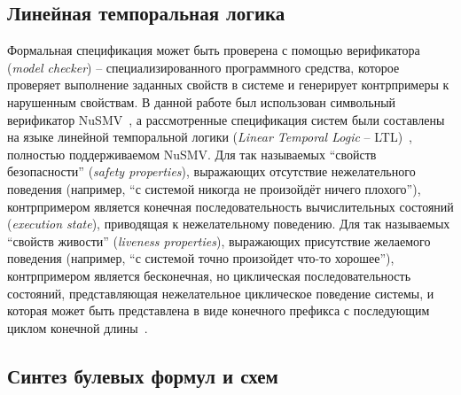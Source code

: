 
\subsection{Линейная темпоральная логика}%
\label{sub:ltl}


Формальная спецификация может быть проверена с помощью верификатора (\emph{model checker}) \--- специализированного программного средства, которое проверяет выполнение заданных свойств в системе и генерирует контрпримеры к нарушенным свойствам.
В данной работе был использован символьный верификатор NuSMV~\cite{NuSMV}, а рассмотренные спецификация систем были составлены на языке линейной темпоральной логики (\textit{Linear Temporal Logic} \--- LTL)~\cite{ltl}, полностью поддерживаемом NuSMV\@.
Для так называемых \enquote{свойств безопасности} (\textit{safety properties}), выражающих отсутствие нежелательного поведения (например, \enquote{с системой никогда не произойдёт ничего плохого}), контрпримером является конечная последовательность вычислительных состояний (\textit{execution state}), приводящая к нежелательному поведению.
Для так называемых \enquote{свойств живости} (\textit{liveness properties}), выражающих присутствие желаемого поведения (например, \enquote{с системой точно произойдет что-то хорошее}), контрпримером является бесконечная, но циклическая последовательность состояний, представляющая нежелательное циклическое поведение системы, и которая может быть представлена в виде конечного префикса с последующим циклом конечной длины~\cite{clarke1999}.



\subsection{Синтез булевых формул и схем}
\label{sub:circuits-synthesis}




